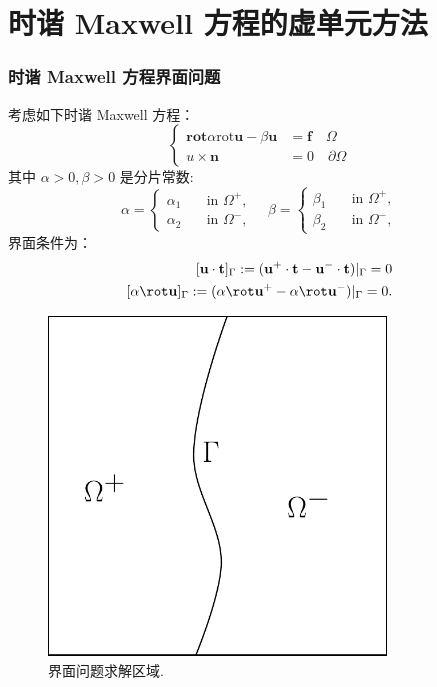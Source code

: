 \documentclass[notheorems,serif]{beamer}
\begin{document}
\section{时谐 Maxwell 方程的虚单元方法}
\begin{frame}
    \frametitle{时谐 Maxwell 方程界面问题}
\begin{minipage}[b]{0.6\linewidth}
    考虑如下时谐 Maxwell 方程：
    $$
    \left\{
    \begin{aligned}
        \mathbf{rot} \alpha \mathrm{rot} \boldsymbol{u} - \beta \boldsymbol{u} & = \boldsymbol{f} \quad
        \Omega\\
        u\times \mathbf{n} & = 0 \quad \partial\Omega
    \end{aligned}
    \right.
    $$
    其中 $\alpha > 0, \beta > 0$ 是分片常数:
    $$
    \alpha = \left\{
    \begin{aligned}
        \alpha_1 \quad & \text{in } \Omega^+,\\
        \alpha_2 \quad & \text{in } \Omega^-,
    \end{aligned}
\right.\quad
\beta = \left\{
\begin{aligned}
    \beta_1 \quad & \text{in } \Omega^+,\\
    \beta_2 \quad & \text{in } \Omega^-,
\end{aligned}
\right.
    $$
    界面条件为：
$$
\begin{aligned}
[\mathbf{u}\cdot\mathbf{t}]_{\Gamma} :=
(\mathbf{u}^+\cdot\mathbf{t}-\mathbf{u}^-\cdot\mathbf{t})|_{\Gamma} = 0\\
[\alpha \rot \mathbf{u}]_{\Gamma} := (\alpha \rot \mathbf{u}^+
- \alpha \rot \mathbf{u}^-)|_{\Gamma} = 0.
\end{aligned}
$$
\end{minipage}
\hfill
\begin{minipage}[b]{0.38\linewidth}
    \centering
    \begin{figure}[htpb]
        \centering
        \includegraphics[width=0.8\textwidth]{../figures/interface_prob.pdf}
        \caption{界面问题求解区域.}
    \end{figure}
\end{minipage}
\end{frame}
\end{document}
